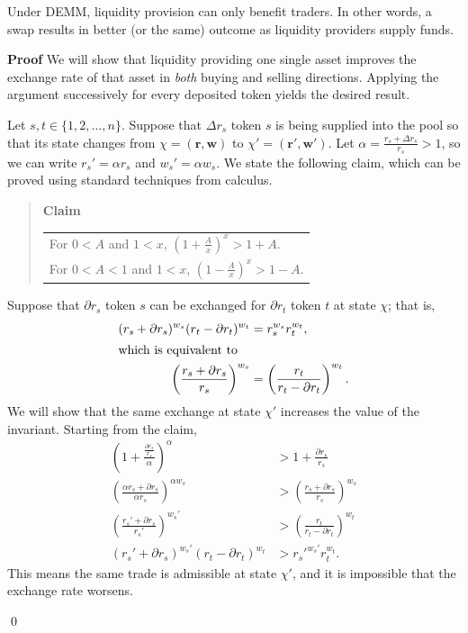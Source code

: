 \documentclass[10pt,a4paper]{amsart}
\newenvironment{proof}{\vspace{1ex}\noindent\textbf{Proof}\hspace{0.5em}}{\hfill\qed\vspace{1ex}}
\begin{document}
\begin{theorem}\label{t:rate}
Under DEMM, liquidity provision can only benefit traders. In other words, a swap results in better (or the same) outcome as liquidity providers supply funds.
\end{theorem}

\begin{proof}
We will show that liquidity providing one single asset improves the exchange rate of that asset in \emph{both} buying and selling directions. Applying the argument successively for every deposited token yields the desired result.

Let $s,t\in\{1,2,\ldots,n\}$. Suppose that $\Delta r_s$ token $s$ is being supplied into the pool so that its state changes from $\chi=(\mathbf{r},\mathbf{w})$ to $\chi'=(\mathbf{r'},\mathbf{w'})$. Let $\alpha=\frac{r_s+\Delta r_s}{r_s}>1$, so we can write $r_s'=\alpha r_s$ and $w_s'=\alpha w_s$. We state the following claim, which can be proved using standard techniques from calculus.

\begin{quote}
\textbf{Claim} \begin{tabular}[t]{@{}l}
For $0<A$ and $1<x$, $\left(1+\frac{A}{x}\right)^x>1+A$. \\
For $0<A<1$ and $1<x$, $\left(1-\frac{A}{x}\right)^x>1-A$.
\end{tabular}
\end{quote}

Suppose that $\partial r_s$ token $s$ can be exchanged for $\partial r_t$ token $t$ at state $\chi$; that is,
\begin{align*}
(r_s+\partial r_s)^{w_s}(r_t-\partial r_t)^{w_t} & =r_s^{w_s}r_t^{w_t}, \\
\intertext{which is equivalent to}
\left(\frac{r_s+\partial r_s}{r_s}\right)^{w_s} & =\left(\frac{r_t}{r_t-\partial r_t}\right)^{w_t}.
\end{align*}
We will show that the same exchange at state $\chi'$ increases the value of the invariant. Starting from the claim,
\begin{align*}
\left(1+\frac{\frac{\partial r_s}{r_s}}{\alpha}\right)^\alpha & >1+\frac{\partial r_s}{r_s} \\
\left(\frac{\alpha r_s+\partial r_s}{\alpha r_s}\right)^{\alpha w_s} & >\left(\frac{r_s+\partial r_s}{r_s}\right)^{w_s} \\
\left(\frac{r_s'+\partial r_s}{r_s'}\right)^{w_s'} & >\left(\frac{r_t}{r_t-\partial r_t}\right)^{w_t} \\
(r_s'+\partial r_s)^{w_s'}(r_t-\partial r_t)^{w_t} & >r_s'^{w_s'}r_t^{w_t}.
\end{align*}
This means the same trade is admissible at state $\chi'$, and it is impossible that the exchange rate worsens.


\end{proof}
\end{document}
